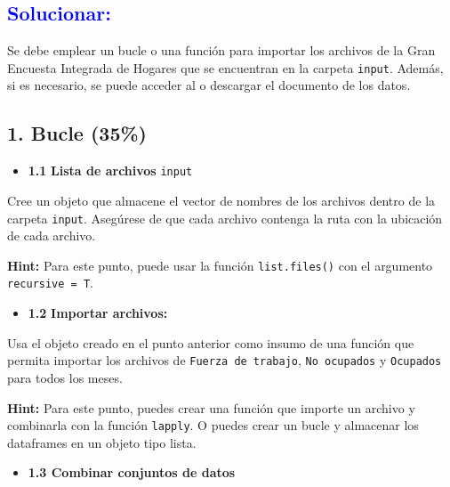 \documentclass[
]{article}
\providecommand{\tightlist}{%
  \setlength{\itemsep}{0pt}\setlength{\parskip}{0pt}}
\begin{document}
\begin{center} \textcolor{blue}{\subsection{Solucionar:}} \end{center}

Se debe emplear un bucle o una función para importar los archivos de la
Gran Encuesta Integrada de Hogares que se encuentran en la carpeta
\texttt{input}. Además, si es necesario, se puede acceder al
\href{https://microdatos.dane.gov.co/index.php/catalog/782/data-dictionary}{\color{blue}{diccionario}}
o descargar el documento
\href{https://www.dane.gov.co/files/operaciones/GEIH/bol-GEIH-dic2023.pdf}{\color{blue}{técnico}}
de los datos.

\subsection{\texorpdfstring{\textbf{1. Bucle
(35\%)}}{1. Bucle (35\%)}}\label{bucle-35}

\begin{itemize}
\tightlist
\item
  \textbf{1.1} \textbf{Lista de archivos} \texttt{input}
\end{itemize}

Cree un objeto que almacene el vector de nombres de los archivos dentro
de la carpeta \texttt{input}. Asegúrese de que cada archivo contenga la
ruta con la ubicación de cada archivo.

\textbf{Hint:} Para este punto, puede usar la función
\texttt{list.files()} con el argumento \texttt{recursive\ =\ T}.

\begin{itemize}
\tightlist
\item
  \textbf{1.2} \textbf{Importar archivos:}
\end{itemize}

Usa el objeto creado en el punto anterior como insumo de una función que
permita importar los archivos de \texttt{Fuerza\ de\ trabajo},
\texttt{No\ ocupados} y \texttt{Ocupados} para todos los meses.

\textbf{Hint:} Para este punto, puedes crear una función que importe un
archivo y combinarla con la función \texttt{lapply}. O puedes crear un
bucle y almacenar los dataframes en un objeto tipo lista.

\begin{itemize}
\tightlist
\item
  \textbf{1.3 Combinar conjuntos de datos}
\end{itemize}
\end{document}
